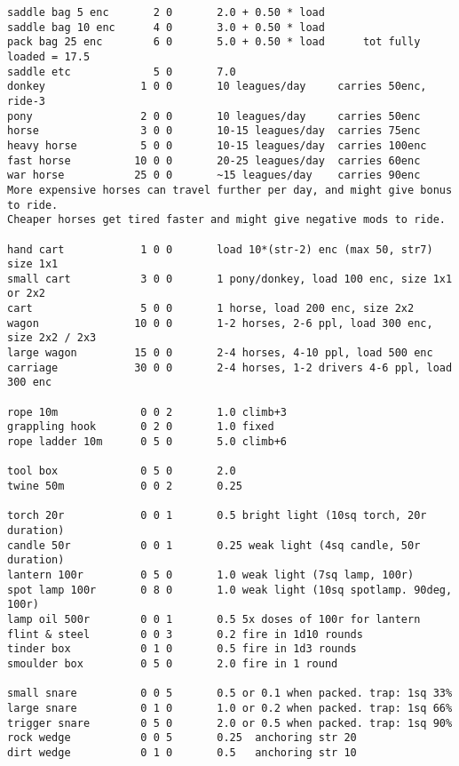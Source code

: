 \begin{verbatim}
saddle bag 5 enc       2 0       2.0 + 0.50 * load
saddle bag 10 enc      4 0       3.0 + 0.50 * load
pack bag 25 enc        6 0       5.0 + 0.50 * load      tot fully loaded = 17.5
saddle etc             5 0       7.0
donkey               1 0 0       10 leagues/day     carries 50enc, ride-3
pony                 2 0 0       10 leagues/day     carries 50enc
horse                3 0 0       10-15 leagues/day  carries 75enc
heavy horse          5 0 0       10-15 leagues/day  carries 100enc
fast horse          10 0 0       20-25 leagues/day  carries 60enc
war horse           25 0 0       ~15 leagues/day    carries 90enc
More expensive horses can travel further per day, and might give bonus to ride.
Cheaper horses get tired faster and might give negative mods to ride.

hand cart            1 0 0       load 10*(str-2) enc (max 50, str7) size 1x1
small cart           3 0 0       1 pony/donkey, load 100 enc, size 1x1 or 2x2
cart                 5 0 0       1 horse, load 200 enc, size 2x2
wagon               10 0 0       1-2 horses, 2-6 ppl, load 300 enc, size 2x2 / 2x3
large wagon         15 0 0       2-4 horses, 4-10 ppl, load 500 enc
carriage            30 0 0       2-4 horses, 1-2 drivers 4-6 ppl, load 300 enc

rope 10m             0 0 2       1.0 climb+3
grappling hook       0 2 0       1.0 fixed
rope ladder 10m      0 5 0       5.0 climb+6

tool box             0 5 0       2.0
twine 50m            0 0 2       0.25

torch 20r            0 0 1       0.5 bright light (10sq torch, 20r duration)
candle 50r           0 0 1       0.25 weak light (4sq candle, 50r duration)
lantern 100r         0 5 0       1.0 weak light (7sq lamp, 100r)
spot lamp 100r       0 8 0       1.0 weak light (10sq spotlamp. 90deg, 100r)
lamp oil 500r        0 0 1       0.5 5x doses of 100r for lantern
flint & steel        0 0 3       0.2 fire in 1d10 rounds
tinder box           0 1 0       0.5 fire in 1d3 rounds
smoulder box         0 5 0       2.0 fire in 1 round

small snare          0 0 5       0.5 or 0.1 when packed. trap: 1sq 33%
large snare          0 1 0       1.0 or 0.2 when packed. trap: 1sq 66%
trigger snare        0 5 0       2.0 or 0.5 when packed. trap: 1sq 90%
rock wedge           0 0 5       0.25  anchoring str 20
dirt wedge           0 1 0       0.5   anchoring str 10
\end{verbatim} %
\normalsize






